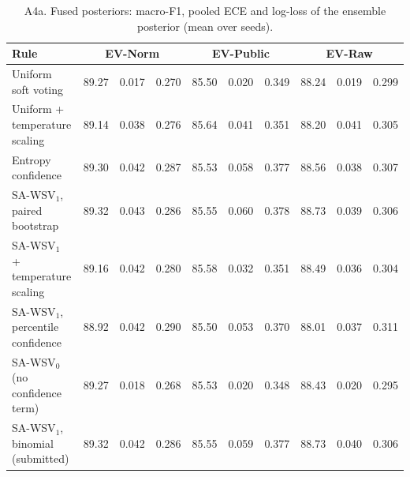 \begin{table}[!htbp]\centering\scriptsize\setlength{\tabcolsep}{2.5pt}
\caption*{A4a. Fused posteriors: macro-F1, pooled ECE and log-loss of the ensemble posterior (mean over seeds).}
\begin{tabular}{lccccccccc}\toprule
Rule & \multicolumn{3}{c}{EV-Norm} & \multicolumn{3}{c}{EV-Public} & \multicolumn{3}{c}{EV-Raw} \\ \midrule
Uniform soft voting & 89.27 & 0.017 & 0.270 & 85.50 & 0.020 & 0.349 & 88.24 & 0.019 & 0.299 \\
Uniform + temperature scaling & 89.14 & 0.038 & 0.276 & 85.64 & 0.041 & 0.351 & 88.20 & 0.041 & 0.305 \\
Entropy confidence & 89.30 & 0.042 & 0.287 & 85.53 & 0.058 & 0.377 & 88.56 & 0.038 & 0.307 \\
SA-WSV$_1$, paired bootstrap & 89.32 & 0.043 & 0.286 & 85.55 & 0.060 & 0.378 & 88.73 & 0.039 & 0.306 \\
SA-WSV$_1$ + temperature scaling & 89.16 & 0.042 & 0.280 & 85.58 & 0.032 & 0.351 & 88.49 & 0.036 & 0.304 \\
SA-WSV$_1$, percentile confidence & 88.92 & 0.042 & 0.290 & 85.50 & 0.053 & 0.370 & 88.01 & 0.037 & 0.311 \\
SA-WSV$_0$ (no confidence term) & 89.27 & 0.018 & 0.268 & 85.53 & 0.020 & 0.348 & 88.43 & 0.020 & 0.295 \\
SA-WSV$_1$, binomial (submitted) & 89.32 & 0.042 & 0.286 & 85.55 & 0.059 & 0.377 & 88.73 & 0.040 & 0.306 \\
\bottomrule\end{tabular}\end{table}

